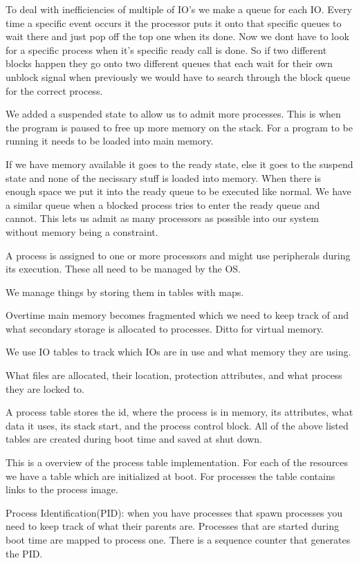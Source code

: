 \documentclass[12pt]{article}
\begin{document}

To deal with inefficiencies of multiple of IO's we make a queue for each IO. Every time a specific event occurs it the processor puts it onto that specific queues to wait there and just pop off the top one when its done. Now we dont have to look for a specific process when it's specific ready call is done. So if two different blocks happen they go onto two different queues that each wait for their own unblock signal when previously we would have to search through the block queue for the correct process.


We added a suspended state to allow us to admit more processes. This is when the program is paused to free up more memory on the stack. For a program to be running it needs to be loaded into main memory.


If we have memory available it goes to the ready state, else it goes to the suspend state and none of the necissary stuff is loaded into memory. When there is enough space we put it into the ready queue to be executed like normal. We have a similar queue when a blocked process tries to enter the ready queue and cannot. This lets us admit as many processors as possible into our system without memory being a constraint.



A process is assigned to one or more processors and might use peripherals during its execution. These all need to be managed by the OS.

We manage things by storing them in tables with maps.

Overtime main memory becomes fragmented which we need to keep track of and what secondary storage is allocated to processes. Ditto for virtual memory.

We use IO tables to track which IOs are in use and what memory they are using.

What files are allocated, their location, protection attributes, and what process they are locked to.

A process table stores the id, where the process is in memory, its attributes, what data it uses, its stack start, and the process control block. All of the above listed tables are created during boot time and saved at shut down.


This is a overview of the process table implementation. For each of the resources we have a table which are initialized at boot. For processes the table contains links to the process image.

Process Identification(PID): when you have processes that spawn processes you need to keep track of what their parents are. Processes that are started during boot time are mapped to process one. There is a sequence counter that generates the PID.
\end{document}
